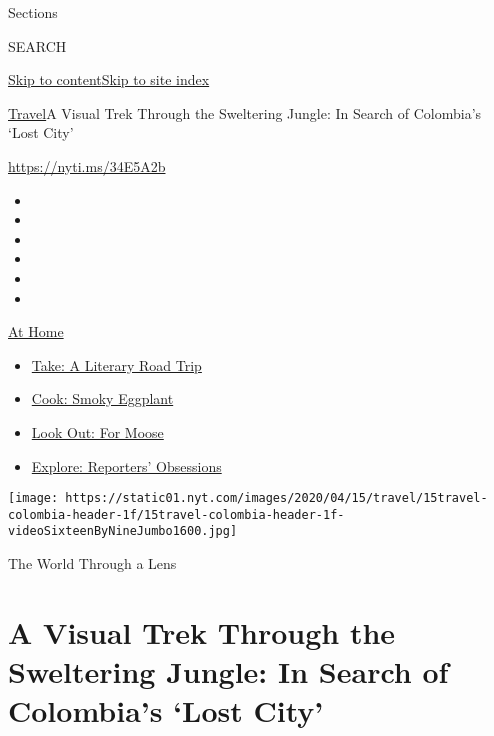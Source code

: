 Sections

SEARCH

\protect\hyperlink{site-content}{Skip to
content}\protect\hyperlink{site-index}{Skip to site index}

\href{/section/travel}{Travel}\textbar{}A Visual Trek Through the
Sweltering Jungle: In Search of Colombia's `Lost City'

\url{https://nyti.ms/34E5A2b}

\begin{itemize}
\item
\item
\item
\item
\item
\item
\end{itemize}

\href{https://www.nytimes.com/spotlight/at-home?action=click\&pgtype=Article\&state=default\&region=TOP_BANNER\&context=at_home_menu}{At
Home}

\begin{itemize}
\tightlist
\item
  \href{https://www.nytimes.com/2020/07/28/books/time-for-a-literary-road-trip.html?action=click\&pgtype=Article\&state=default\&region=TOP_BANNER\&context=at_home_menu}{Take:
  A Literary Road Trip}
\item
  \href{https://www.nytimes.com/2020/07/29/magazine/bored-with-your-home-cooking-some-smoky-eggplant-will-fix-that.html?action=click\&pgtype=Article\&state=default\&region=TOP_BANNER\&context=at_home_menu}{Cook:
  Smoky Eggplant}
\item
  \href{https://www.nytimes.com/2020/07/27/travel/moose-michigan-isle-royale.html?action=click\&pgtype=Article\&state=default\&region=TOP_BANNER\&context=at_home_menu}{Look
  Out: For Moose}
\item
  \href{https://www.nytimes.com/interactive/2020/at-home/even-more-reporters-editors-diaries-lists-recommendations.html?action=click\&pgtype=Article\&state=default\&region=TOP_BANNER\&context=at_home_menu}{Explore:
  Reporters' Obsessions}
\end{itemize}

\texttt{[image: https://static01.nyt.com/images/2020/04/15/travel/15travel-colombia-header-1f/15travel-colombia-header-1f-videoSixteenByNineJumbo1600.jpg]}

The World Through a Lens

\hypertarget{a-visual-trek-through-the-sweltering-jungle-in-search-of-colombias-lost-city}{%
\section{A Visual Trek Through the Sweltering Jungle: In Search of
Colombia's `Lost
City'}\label{a-visual-trek-through-the-sweltering-jungle-in-search-of-colombias-lost-city}}

